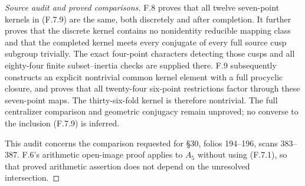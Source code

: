 \begin{proof}[Source audit and proved comparisons]
F.8 proves that all twelve seven-point kernels in (F.7.9)
are the same, both discretely and after completion. It further
proves that the discrete kernel contains no nonidentity reducible
mapping class and that the completed kernel meets every conjugate
of every full source cusp subgroup trivially. The exact four-point
characters detecting those cusps and all eighty-four finite
subset--inertia checks are supplied there. F.9 subsequently
constructs an explicit nontrivial common kernel element with
a full procyclic closure, and proves that all twenty-four
six-point restrictions factor through these seven-point maps.
The thirty-six-fold kernel is therefore nontrivial. The full
centralizer comparison and geometric conjugacy remain unproved;
no converse to the inclusion (F.7.9) is inferred.

This audit concerns the comparison requested for
\S30, folios 194--196, scans 383--387. F.6's
arithmetic open-image proof applies to $A_5$ without
using (F.7.1), so that proved arithmetic assertion
does not depend on the unresolved intersection.
\end{proof}
